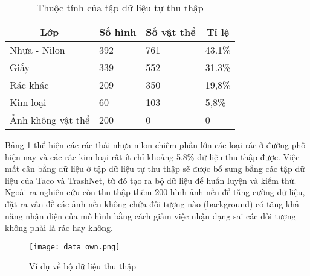 \documentclass[../the.tex]{subfiles}
\begin{document}
{\fontsize{13}{12} \selectfont
\begin{table}[!ht]
	\centering
	\caption{Thuộc tính của tập dữ liệu tự thu thập}
	\begin{tabular}{|l|l|l|l|}
		\hline
		 \multicolumn{1}{|c|}{\textbf{Lớp}}
		 & \multicolumn{1}{c|}{\textbf{Số hình}} 
		 & \multicolumn{1}{c|}{\textbf{Số vật thể}}
		 & \multicolumn{1}{c|}{\textbf{Tỉ lệ}}
		  \\
		\hline

		  Nhựa - Nilon & 392 & 761 & 43.1\%  \\
		\hline

			Giấy & 339 & 552   & 31.3\%                                        \\
		\hline

		 Rác khác & 209 & 350   & 19,8\%                                        \\
		\hline

		 Kim loại & 60 & 103    & 5,8\%                                         \\
		\hline
		 Ảnh không vật thể & 200 & 0   & 0                                         \\
		\hline

	\end{tabular}

	\label{tab:datasetown}
\end{table}
Bảng \ref{tab:datasetown} thể hiện các rác thải nhựa-nilon chiếm phần lớn các loại rác ở đường phố hiện nay và các rác kim loại rất ít chỉ khoảng 5,8\% dữ liệu thu thập được.
Việc mất cân bằng dữ liệu ở tập dữ liệu tự thu thập sẽ được bổ sung bằng các tập dữ liệu của Taco và TrashNet, từ đó tạo ra bộ dữ liệu để huấn luyện và kiểm thử.
Ngoài ra nghiên cứu còn thu thập thêm 200 hình ảnh nền để tăng cường dữ liệu, đặt ra vấn đề các ảnh nền không chứa đối tượng nào (background) có tăng khả năng nhận diện của mô hình bằng cách giảm việc nhận dạng sai các đối tượng không phải là rác hay không.
}


\begin{figure}[H]
	\centering
	\texttt{[image: data\_own.png]}
	\caption{Ví dụ về bộ dữ liệu thu thập}
	\label{fig:dataset_own}
\end{figure}
\end{document}
